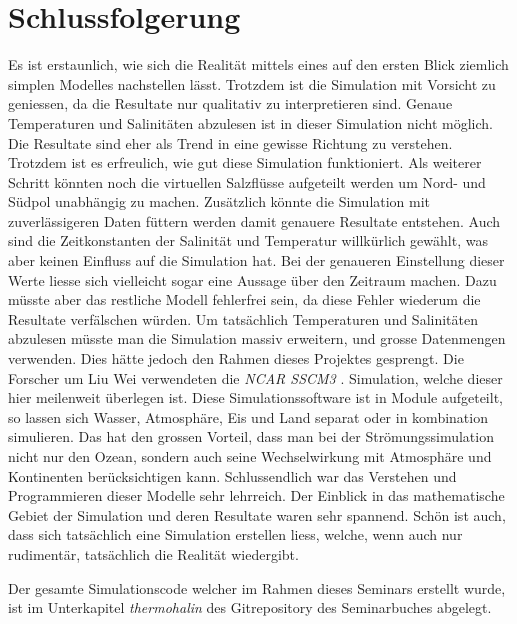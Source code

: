 \section{Schlussfolgerung}

Es ist erstaunlich, wie sich die Realität mittels eines auf den ersten Blick ziemlich simplen Modelles nachstellen lässt. Trotzdem ist die Simulation mit Vorsicht zu geniessen, da die Resultate nur qualitativ zu interpretieren sind. Genaue Temperaturen und Salinitäten abzulesen ist in dieser Simulation nicht möglich. Die Resultate sind eher als Trend in eine gewisse Richtung zu verstehen. Trotzdem ist es erfreulich, wie gut diese Simulation funktioniert. 
Als weiterer Schritt könnten noch die virtuellen Salzflüsse aufgeteilt werden um Nord- und Südpol unabhängig zu machen. Zusätzlich könnte die Simulation mit zuverlässigeren Daten füttern werden damit genauere Resultate entstehen. Auch sind die Zeitkonstanten der Salinität und Temperatur willkürlich gewählt, was aber keinen Einfluss auf die Simulation hat. Bei der genaueren Einstellung dieser Werte liesse sich vielleicht sogar eine Aussage über den Zeitraum machen. Dazu müsste aber das restliche Modell fehlerfrei sein, da diese Fehler wiederum die Resultate verfälschen würden.
Um tatsächlich Temperaturen und Salinitäten abzulesen müsste man die Simulation massiv erweitern, und grosse Datenmengen verwenden. Dies hätte jedoch den Rahmen dieses Projektes gesprengt. 
Die Forscher um Liu Wei \cite{thermohalin:liuwei} verwendeten die {\em NCAR SSCM3} \cite{thermohalin:sim}. Simulation, welche dieser hier meilenweit überlegen ist. Diese Simulationssoftware ist in Module aufgeteilt, so lassen sich Wasser, Atmosphäre, Eis und Land separat oder in kombination simulieren. Das hat den grossen Vorteil, dass man bei der Strömungssimulation nicht nur den Ozean, sondern auch seine Wechselwirkung mit Atmosphäre und Kontinenten berücksichtigen kann. 
Schlussendlich war das Verstehen und Programmieren dieser Modelle sehr lehrreich. Der Einblick in das mathematische Gebiet der Simulation und deren Resultate waren sehr spannend. Schön ist auch, dass sich tatsächlich eine Simulation erstellen liess, welche, wenn auch nur rudimentär, tatsächlich die Realität wiedergibt.

Der gesamte Simulationscode welcher im Rahmen dieses Seminars erstellt wurde, ist im Unterkapitel {\em thermohalin} des Gitrepository des Seminarbuches abgelegt\cite{thermohalin:gitrepo-klimawandel}.
